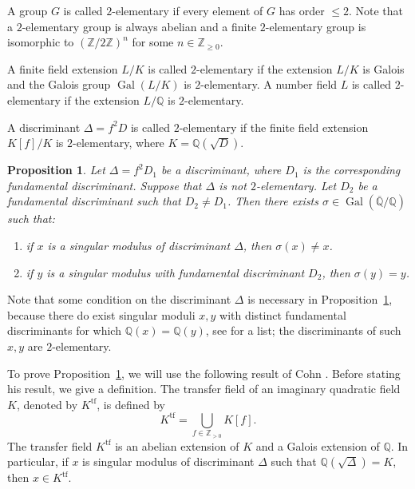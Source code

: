 \documentclass[12pt,a4paper,oneside]{amsart}
\newtheorem{proposition}[theorem]{Proposition}
\DeclareMathOperator{\gal}{Gal}
\begin{document}
A group $G$ is called $2$-elementary if every element of $G$ has order $\leq 2$. Note that a $2$-elementary group is always abelian and a finite $2$-elementary group is isomorphic to $(\mathbb{Z} / 2\mathbb{Z})^n$ for some $n \in \mathbb{Z}_{\geq 0}$. 

A finite field extension $L/K$ is called $2$-elementary if the extension $L/K$ is Galois and the Galois group $\gal(L/K)$ is $2$-elementary. A number field $L$ is called $2$-elementary if the extension $L/ \mathbb{Q}$ is $2$-elementary.

A discriminant $\Delta=f^2 D$ is called $2$-elementary if the finite field extension $K[f]/K$ is $2$-elementary, where $K = \mathbb{Q}(\sqrt{D})$. 

\begin{proposition}\label{prop:auto}
    Let $\Delta = f^2 D_1$ be a discriminant, where $D_1$ is the corresponding fundamental discriminant. Suppose that $\Delta$ is not $2$-elementary. Let $D_2$ be a fundamental discriminant such that $D_2 \neq D_1$. Then there exists $\sigma \in \gal(\overline{\mathbb{Q}} / \mathbb{Q})$ such that:
    \begin{enumerate}
        \item if $x$ is a singular modulus of discriminant $\Delta$, then $\sigma(x) \neq x$.
        \item if $y$ is a singular modulus with fundamental discriminant $D_2$, then $\sigma(y) = y$.
    \end{enumerate}
\end{proposition}

Note that some condition on the discriminant $\Delta$ is necessary in Proposition~\ref{prop:auto}, because there do exist singular moduli $x, y$ with distinct fundamental discriminants for which $\mathbb{Q}(x) = \mathbb{Q}(y)$, see \cite[Table~2]{AllombertBiluMadariaga15} for a list; the discriminants of such $x, y$ are $2$-elementary.

	

  

To prove Proposition~\ref{prop:auto}, we will use the following result of Cohn \cite{Cohn94}.
Before stating his result, we give a definition.
The transfer field of an imaginary quadratic field $K$, denoted by $K^\mathrm{tf}$, is defined by
\[ K^{\mathrm{tf}} = \bigcup_{f \in \mathbb{Z}_{>0}} K[f].\]
The transfer field $K^\mathrm{tf}$ is an abelian extension of $K$ and a Galois extension of $\mathbb{Q}$.
In particular, if $x$ is singular modulus of discriminant $\Delta$ such that $\mathbb{Q}(\sqrt{\Delta}) = K$, then  $x \in K^\mathrm{tf}$.
\end{document}
